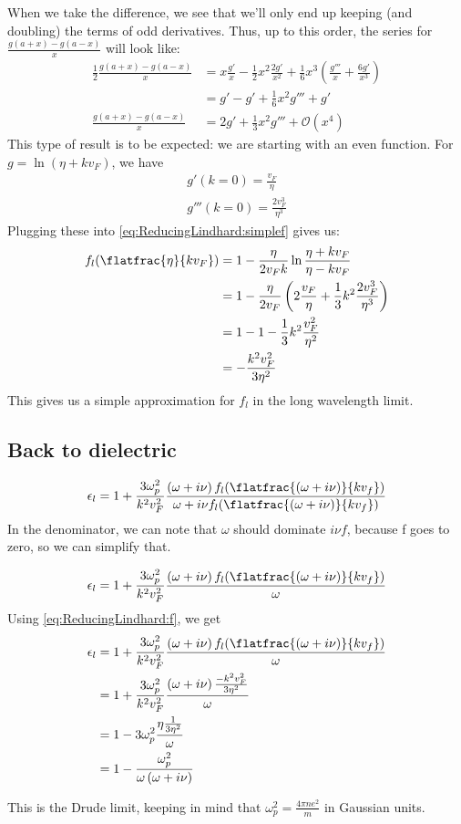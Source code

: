 \documentclass[../../main.tex]{subfiles}
\newcommand{\vf}{v_F}
\begin{document}
When we take the difference, we see that we'll only end up keeping (and doubling) the terms of odd derivatives. Thus, up to this order, the series for $\frac{g(a + x) - g(a - x)}{x}$ will look like:
\begin{align}
	\frac12 \frac{g(a + x) - g(a - x)}{x} &= x \frac{g'}{x} - \frac12 x^2 \frac{2 g'}{x^2} + \frac16 x^3 \left( \frac{g'''}{x} + \frac{6 g'}{x^3} \right) \\
	&= g' - g' + \frac16 x^2 g''' + g' \\
	\frac{g(a + x) - g(a - x)}{x} &= 2g' + \frac13 x^2 g''' + \mathcal{O}(x^4)
\end{align}
This type of result is to be expected: we are starting with an even function. For $g = \ln(\eta + k \vf)$, we have
\begin{align}
	g'(k = 0) = \frac{\vf}{\eta} \\
	g'''(k = 0) = \frac{2 \vf^3}{\eta^3}
\end{align}
Plugging these into \eqref{eq:ReducingLindhard:simplef} gives us:
\begin{align}
	f_l(\flatfrac{\eta}{k \vf}) &= 1 - \frac{\eta}{2 \vf k} \ln\frac{\eta + k \vf}{\eta - k\vf} \\
	&= 1- \frac{\eta}{2\vf} \left( 2 \frac{\vf}{\eta} + \frac13 k^2 \frac{2 \vf^3}{\eta^3} \right) \\
	&= 1 - 1 - \frac13 k^2 \frac{\vf^2}{\eta^2}	\\
	&= - \frac{k^2 \vf^2}{3 \eta^2} \label{eq:ReducingLindhard:f}
\end{align}
This gives us a simple approximation for $f_l$ in the long wavelength limit.

\subsection{Back to dielectric}
\begin{equation} \label{eq:ReducingLindhard:EpsWithF} 
 \epsilon_l = 1 + \frac{3 \omega_p^2}{k^2 v_F^2} \frac{\left(\omega + i \nu \right) f_l(\flatfrac{(\omega + i \nu)}{k v_f})}{\omega + i \nu f_l(\flatfrac{(\omega + i \nu)}{k v_f})}
\end{equation}
In the denominator, we can note that $\omega$ should dominate $i \nu f$, because f goes to zero, so we can simplify that. 

\begin{equation}
	 \epsilon_l = 1 + \frac{3 \omega_p^2}{k^2 v_F^2} \frac{\left(\omega + i \nu \right) f_l(\flatfrac{(\omega + i \nu)}{k v_f})}{\omega}
\end{equation}
Using \eqref{eq:ReducingLindhard:f}, we get
\begin{align}
	\epsilon_l &= 1 + \frac{3 \omega_p^2}{k^2 v_F^2} \frac{\left(\omega + i \nu \right) f_l(\flatfrac{(\omega + i \nu)}{k v_f})}{\omega} \\
	&= 1 + \frac{3 \omega_p^2}{k^2 v_F^2} \frac{\left(\omega + i \nu \right) \frac{-k^2 \vf^2}{3 \eta^2}}{\omega} \\
	&= 1 - 3 \omega_p^2 \frac{\eta \frac{1}{ 3\eta^2}}{\omega} \\
	&= 1 - \frac{ \omega_p^2}{\omega \left( \omega + i \nu \right)}
\end{align}

This is the Drude limit, keeping in mind that $\omega_p^2 = \frac{4\pi n e^2}{m}$ in Gaussian units.
\end{document}
